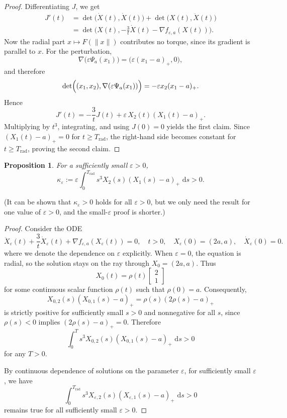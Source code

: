 \documentclass{article}
\newtheorem{proposition}[theorem]{Proposition}
\theoremstyle{remark}
\newcommand{\dd}{\,\mathrm{d}}
\begin{document}
\begin{proof}
Differentiating $J $, we get
\begin{align*}
  J '(t)
  &=
  \det\bigl(\dot X (t),\dot X (t)\bigr)
  +\det\bigl(X (t),\ddot X (t)\bigr)\\
  &=
  \det\!\Big(
    X (t),
    -\frac{3}{t}\dot X (t)-\nabla f_{\varepsilon,a}(X (t))
  \Big).
\end{align*}
Now the radial part $x\mapsto F(\|x\|)$ contributes no torque, since its gradient is parallel to $x$. For the perturbation,
\[
  \nabla\bigl(\varepsilon\Psi_a(x_1)\bigr)
  =
  \bigl(\varepsilon(x_1-a)_+,0\bigr),
\]
and therefore
\[
  \det\Bigl((x_1,x_2),\nabla(\varepsilon\Psi_a(x_1))\Bigr)
  =
  -\varepsilon x_2(x_1-a)_+.
\]
Hence
\[
  J '(t)
  =
  -\frac{3}{t}J (t)
  +
  \varepsilon\,X_{2}(t)(X_{1}(t)-a)_+.
\]
Multiplying by $t^3$, integrating, and using $J (0)=0$ yields the first claim.
Since $(X_{1}(t)-a)_+=0$ for $t\ge T_\mathrm{rad}$, the right-hand side becomes constant for $t\ge T_\mathrm{rad}$, proving the second claim.
\end{proof}

\begin{proposition}\label{prop:created-angular-momentum}
For a sufficiently small $\varepsilon>0$, 
\[
  \kappa_\varepsilon:=
  \varepsilon \int_0^{T_\mathrm{rad}} s^3 X_{2}(s)(X_{1}(s)-a)_+\,\dd s>0.
\]
\end{proposition}
(It can be shown that $\kappa_\varepsilon>0$ holds for all $\varepsilon>0$, but we only need the result for one value of $\varepsilon>0$, and the small-$\varepsilon$ proof is shorter.)
\begin{proof}
Consider the ODE
\[
  \ddot X_\varepsilon(t)+\frac{3}{t}\dot X_\varepsilon(t)+\nabla f_{\varepsilon,a}(X_\varepsilon(t))=0,
  \quad t>0,
  \quad X_\varepsilon(0)=(2a,a),
  \quad \dot X_\varepsilon(0)=0.
\]
where we denote the dependence on $\varepsilon$ explicitly. When $\varepsilon=0$, the equation is radial, so the solution stays on the ray through $X_0=(2a,a)$. Thus
\[
  X_0(t)=\rho(t)
  \begin{bmatrix}
  2\\1
  \end{bmatrix}
\]
for some continuous scalar function $\rho(t)$ such that $\rho(0)=a$. Consequently,
\[
  X_{0,2}(s)(X_{0,1}(s)-a)_+
  =
  \rho(s)(2\rho(s)-a)_+
\]
is strictly positive for sufficiently small $s>0$
and nonnegative for all $s$, since $\rho(s)<0$ implies $(2\rho(s)-a)_+=0$.
Therefore
\[
  \int_0^T s^3 X_{0,2}(s)(X_{0,1}(s)-a)_+\,\dd s>0
\]
for any $T>0$.


 By continuous dependence of solutions on the parameter $\varepsilon$, for sufficiently small $\varepsilon$, we have 
\[
  \int_0^{T_\mathrm{rad}} s^3 X_{\varepsilon,2}(s)(X_{\varepsilon,1}(s)-a)_+\,\dd s>0
\]
remains true for all sufficiently small $\varepsilon>0$.
\end{proof}
\end{document}
